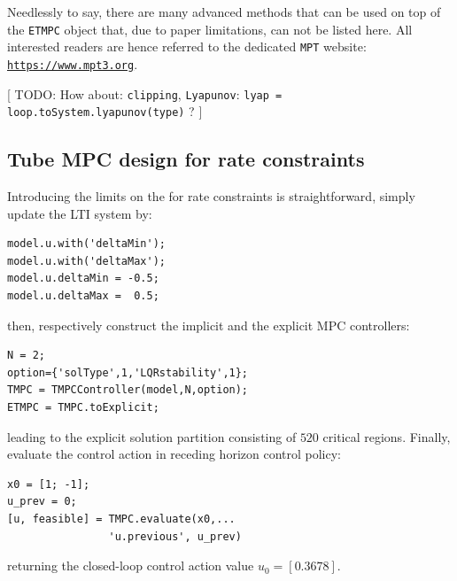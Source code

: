 \documentclass[letterpaper, 10 pt, conference]{ieeeconf}
\begin{document}
Needlessly to say, there are many advanced methods that can be used on top of the \verb|ETMPC| object that, due to paper limitations, can not be listed here. All interested readers are hence referred to the dedicated \texttt{MPT} website: \\ \texttt{\url{https://www.mpt3.org}}.

[ TODO: How about: \texttt{clipping}, \texttt{Lyapunov}: \texttt{lyap = loop.toSystem.lyapunov(type)} ? ]

\subsection{Tube MPC design for rate constraints}
\label{sec:mptplus_tube_mpc_delta_u}

Introducing the limits on the for rate constraints is straightforward, simply update the LTI system by:
\begin{lstlisting}[style=Matlab-editor]
model.u.with('deltaMin');
model.u.with('deltaMax');
model.u.deltaMin = -0.5;
model.u.deltaMax =  0.5;
\end{lstlisting}
then, respectively construct the implicit and the explicit MPC controllers:
\begin{lstlisting}[style=Matlab-editor]
N = 2;
option={'solType',1,'LQRstability',1};
TMPC = TMPCController(model,N,option);
ETMPC = TMPC.toExplicit;
\end{lstlisting}
leading to the explicit solution partition consisting of $520$ critical regions. Finally, evaluate the control action in receding horizon control policy:
\begin{lstlisting}[style=Matlab-editor]
x0 = [1; -1];
u_prev = 0;
[u, feasible] = TMPC.evaluate(x0,...
                'u.previous', u_prev)
\end{lstlisting}
returning the closed-loop control action value $u_0 = [0.3678]$.

%
\end{document}

